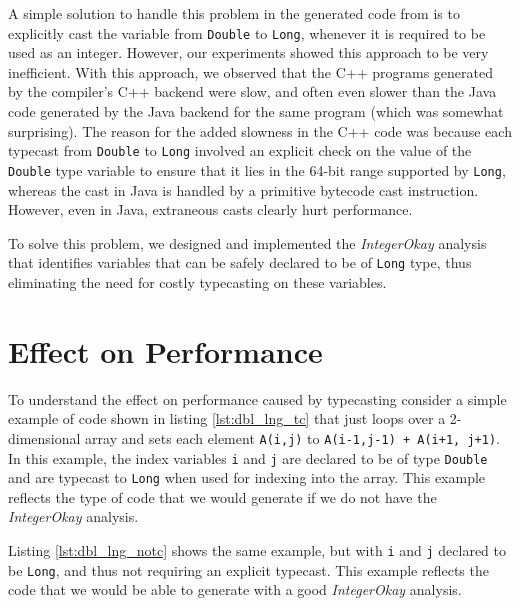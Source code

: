 A simple solution to handle this problem in the generated code from
\matlab is to explicitly cast the variable from \texttt{Double} to
\texttt{Long}, whenever it is required to be used as an integer.
However, our experiments showed this approach to be very inefficient.
With this approach, we observed that the C++ programs generated by the
\xten compiler's C++ backend were slow, and often
even slower than the Java code generated by the \xten Java backend for
the same program (which was somewhat surprising). 
The reason for the added slowness in the C++ code was because each
typecast from \texttt{Double} to \texttt{Long} involved an explicit check on the
value of the \texttt{Double} type variable to ensure that it lies in the
64-bit range supported by \texttt{Long}, whereas the cast in Java is
handled by a primitive bytecode cast instruction.   However, even in
Java, extraneous casts clearly hurt performance.

To solve this problem, we designed and implemented the
\emph{IntegerOkay} analysis that identifies variables that can be
safely declared to be of \texttt{Long} type, thus eliminating the need
for costly typecasting on these variables.

\section{Effect on Performance}

To understand the effect on performance caused by typecasting consider a
simple example of \xten code shown in listing \ref{lst:dbl_lng_tc} that just loops
over a 2-dimensional array and sets each element \texttt{A(i,j)} to
\texttt{A(i-1,j-1) + A(i+1, j+1)}.
In this example, the
index variables \texttt{i} and \texttt{j} are declared to be of type
\texttt{Double} and are typecast to \texttt{Long} when used for indexing
into the array.   This example reflects the type of \xten code that we
would generate if we do not have the \emph{IntegerOkay} analysis.

Listing \ref{lst:dbl_lng_notc} shows the same example,
but with \texttt{i} and \texttt{j} declared to be \texttt{Long}, and
thus not requiring an explicit typecast. This example reflects the code
that we would be able to generate with a good \emph{IntegerOkay} analysis.

